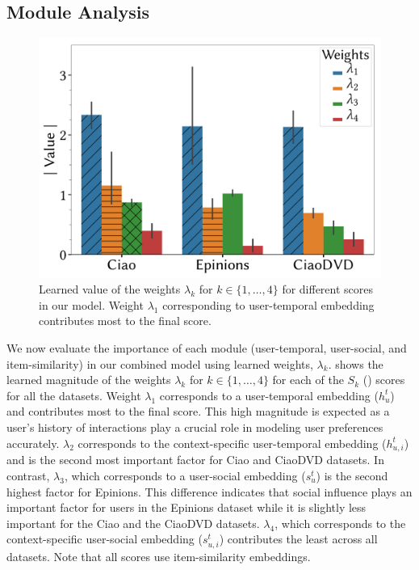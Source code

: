 \subsection{Module Analysis}
\label{sec:mod}

\begin{figure}[tbh]
 \centering
   \includegraphics[scale=0.36]{figures/weight.pdf}
 \caption{Learned value of the weights $\lambda_k$ for $k \in \{ 1, \ldots ,4 \}$ for different scores in our model. Weight $\lambda_1$ corresponding to user-temporal embedding contributes most to the final score.}
 \label{fig:weight}
\end{figure}

We now evaluate the importance of each module (user-temporal, user-social, and item-similarity) in our combined model using learned weights, $\lambda_k$.  shows the learned magnitude of the weights $\lambda_k$ for $k \in \{ 1, \ldots ,4 \}$ for each of the $S_k$ () scores for all the datasets. Weight $\lambda_1$ corresponds to a user-temporal embedding ($h_u^t$) %
and contributes most to the final score. This high magnitude is expected as a user's history of interactions play a crucial role in modeling user preferences accurately.
$\lambda_2$ corresponds to the context-specific user-temporal embedding ($h_{u,i}^t$) and is the second most important factor for Ciao and CiaoDVD datasets. In contrast, $\lambda_3$, which corresponds to a  user-social embedding ($s_{u}^t$) is the second highest factor for Epinions. This difference indicates that social influence plays an important factor for users in the Epinions dataset while it is slightly less important for the Ciao and the CiaoDVD datasets. $\lambda_4$, which  corresponds to the context-specific user-social embedding ($s_{u,i}^t$) contributes the least across all datasets. Note that all scores use item-similarity embeddings.

